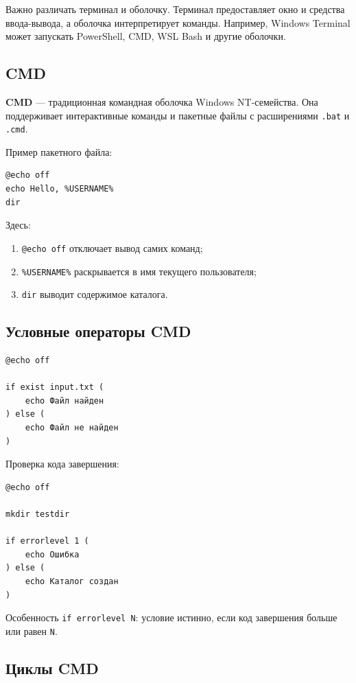 \documentclass[12pt,a4paper]{article}
\begin{document}
Важно различать терминал и оболочку. Терминал предоставляет окно и средства ввода-вывода, а оболочка интерпретирует команды. Например, Windows Terminal может запускать PowerShell, CMD, WSL Bash и другие оболочки.

\subsection{CMD}

\textbf{CMD} --- традиционная командная оболочка Windows NT-семейства. Она поддерживает интерактивные команды и пакетные файлы с расширениями \texttt{.bat} и \texttt{.cmd}.

Пример пакетного файла:

\begin{lstlisting}
@echo off
echo Hello, %USERNAME%
dir
\end{lstlisting}

Здесь:
\begin{enumerate}
    \item \texttt{@echo off} отключает вывод самих команд;
    \item \texttt{\%USERNAME\%} раскрывается в имя текущего пользователя;
    \item \texttt{dir} выводит содержимое каталога.
\end{enumerate}

\subsection{Условные операторы CMD}

\begin{lstlisting}
@echo off

if exist input.txt (
    echo Файл найден
) else (
    echo Файл не найден
)
\end{lstlisting}

Проверка кода завершения:

\begin{lstlisting}
@echo off

mkdir testdir

if errorlevel 1 (
    echo Ошибка
) else (
    echo Каталог создан
)
\end{lstlisting}

Особенность \texttt{if errorlevel N}: условие истинно, если код завершения больше или равен \texttt{N}.

\subsection{Циклы CMD}
\end{document}
